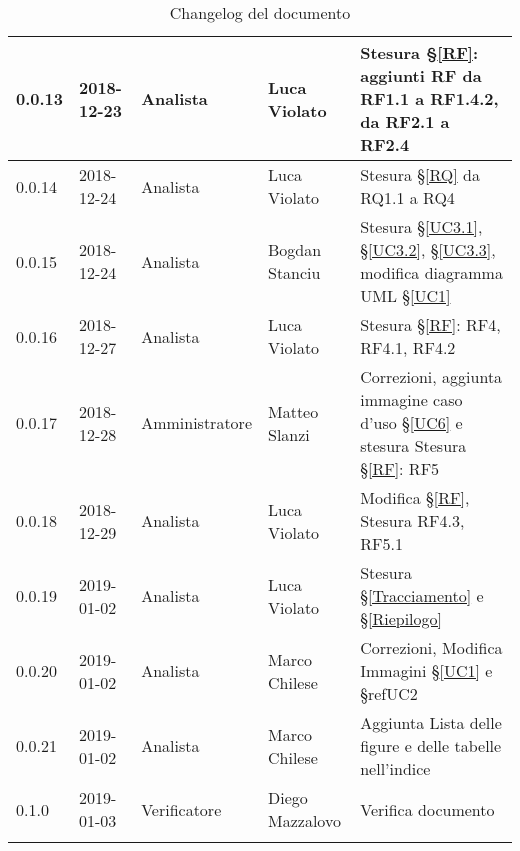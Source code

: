 \begin{center}
\begin{longtable}[c]{|m{}|m{}|m{}|m{}|p{}|}
\hline
0.0.13 & 2018-12-23 & Analista & Luca Violato & Stesura §\ref{RF}: aggiunti RF da RF1.1 a RF1.4.2, da RF2.1 a RF2.4\\
\hline
\rowcolor{grigio}0.0.14 & 2018-12-24 & Analista & Luca Violato & Stesura §\ref{RQ} da RQ1.1 a RQ4\\
\hline
0.0.15 & 2018-12-24 & Analista & Bogdan Stanciu & Stesura §\ref{UC3.1}, §\ref{UC3.2}, §\ref{UC3.3}, modifica diagramma UML §\ref{UC1} \\
\hline
\rowcolor{grigio}0.0.16 & 2018-12-27 & Analista & Luca Violato & Stesura §\ref{RF}: RF4, RF4.1, RF4.2\\
\hline
0.0.17 & 2018-12-28 & Amministratore & Matteo Slanzi & Correzioni, aggiunta immagine caso d'uso §\ref{UC6} e
stesura Stesura §\ref{RF}: RF5\\
\hline
\rowcolor{grigio}0.0.18 & 2018-12-29 & Analista & Luca Violato & Modifica §\ref{RF}, Stesura RF4.3, RF5.1\\
\hline
0.0.19 & 2019-01-02 & Analista & Luca Violato & Stesura §\ref{Tracciamento} e §\ref{Riepilogo}\\
\hline
\rowcolor{grigio}0.0.20 & 2019-01-02 & Analista & Marco Chilese & Correzioni, Modifica Immagini §\ref{UC1} e §ref{UC2}\\
\hline
0.0.21 & 2019-01-02 & Analista & Marco Chilese & Aggiunta Lista delle figure e delle tabelle nell'indice\\
\hline
0.1.0 & 2019-01-03 & Verificatore & Diego Mazzalovo & Verifica documento\\
\hline
\caption{Changelog del documento}
\end{longtable}
\end{center}